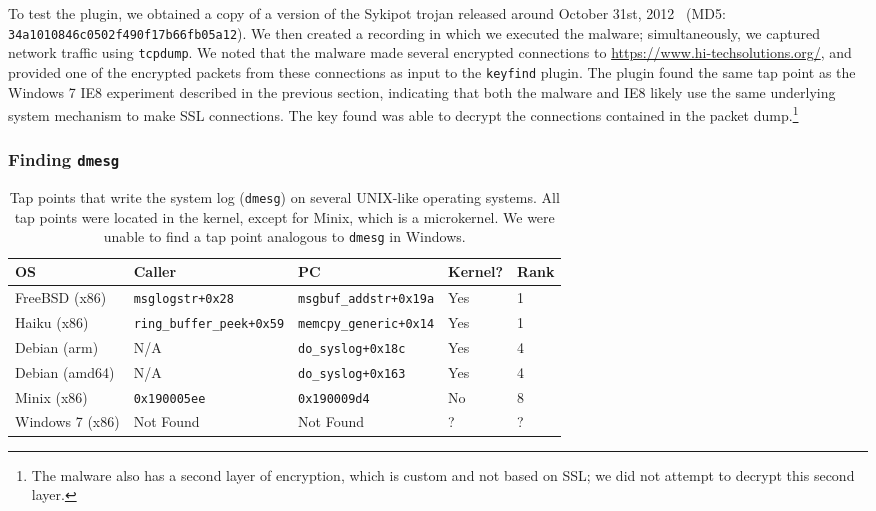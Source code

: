 To test the plugin, we obtained a copy of a version of the Sykipot
trojan released around October 31st, 2012~\cite{sandymal} (MD5:
\texttt{34a1010846c0502f490f17b66fb05a12}). We then created a recording
in which we executed the malware; simultaneously, we captured network
traffic using \texttt{tcpdump}. We noted that the malware made several
encrypted connections to \url{https://www.hi-techsolutions.org/}, and
provided one of the encrypted packets from these connections as input to
the \texttt{keyfind} plugin. The plugin found the same tap point as the
Windows 7 IE8 experiment described in the previous section, indicating
that both the malware and IE8 likely use the same underlying system
mechanism to make SSL connections. The key found was able to decrypt the
connections contained in the packet dump.\footnote{The malware also has
a second layer of encryption, which is custom and not based on SSL; we
did not attempt to decrypt this second layer.}

\subsubsection{Finding \large \texttt{dmesg}}
\label{sec:eval:subsec:dmesg}

\begin{table*}
    \centering
    \small
    \begin{tabular}{|l|l|l|l|l|}
        \hline
        OS & Caller & PC & Kernel? & Rank \\
        \hline
        FreeBSD (x86) & \texttt{msglogstr+0x28} & \texttt{msgbuf\_addstr+0x19a} & Yes & 1 \\
        Haiku (x86) & \texttt{ring\_buffer\_peek+0x59} & \texttt{memcpy\_generic+0x14} & Yes & 1 \\
        Debian (arm) & N/A & \texttt{do\_syslog+0x18c} & Yes & 4 \\
        Debian (amd64) & N/A & \texttt{do\_syslog+0x163} & Yes & 4 \\ 
        Minix (x86) & \texttt{0x190005ee} & \texttt{0x190009d4} & No & 8 \\
        Windows 7 (x86) & Not Found & Not Found & ? & ? \\
        \hline
    \end{tabular}
\caption{Tap points that write the system log (\texttt{dmesg}) on
several UNIX-like operating systems. All tap points were located in the
kernel, except for Minix, which is a microkernel. We were unable to find
a tap point analogous to \texttt{dmesg} in Windows.}
\label{tbl:dmesg}
\end{table*}

